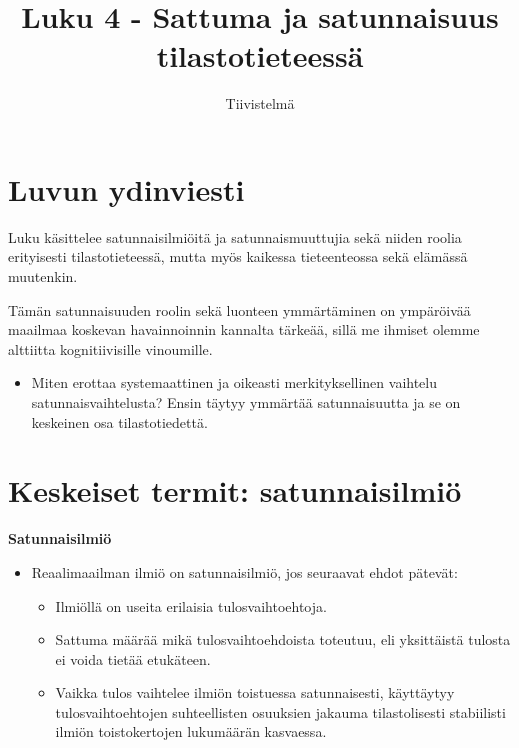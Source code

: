 \documentclass[
]{report}
\title{Luku 4 - Sattuma ja satunnaisuus tilastotieteessä}
\subtitle{Tiivistelmä}
\author{}
\date{}
\providecommand{\tightlist}{%
  \setlength{\itemsep}{0pt}\setlength{\parskip}{0pt}}\usepackage{longtable,booktabs,array}
\begin{document}
\maketitle
\ifdefined\Shaded\renewenvironment{Shaded}{\begin{tcolorbox}[borderline west={3pt}{0pt}{shadecolor}, boxrule=0pt, sharp corners, interior hidden, breakable, enhanced, frame hidden]}{\end{tcolorbox}}\fi

\hypertarget{luvun-ydinviesti}{%
\section{Luvun ydinviesti}\label{luvun-ydinviesti}}

Luku käsittelee satunnaisilmiöitä ja satunnaismuuttujia sekä niiden
roolia erityisesti tilastotieteessä, mutta myös kaikessa tieteenteossa
sekä elämässä muutenkin.

Tämän satunnaisuuden roolin sekä luonteen ymmärtäminen on ympäröivää
maailmaa koskevan havainnoinnin kannalta tärkeää, sillä me ihmiset
olemme alttiitta kognitiivisille vinoumille.

\begin{itemize}
\tightlist
\item
  Miten erottaa systemaattinen ja oikeasti merkityksellinen vaihtelu
  satunnaisvaihtelusta? Ensin täytyy ymmärtää satunnaisuutta ja se on
  keskeinen osa tilastotiedettä.
\end{itemize}

\hypertarget{keskeiset-termit-satunnaisilmiuxf6}{%
\section{Keskeiset termit:
satunnaisilmiö}\label{keskeiset-termit-satunnaisilmiuxf6}}

\begin{defblock}{}

\textbf{Satunnaisilmiö}

\begin{itemize}
\item
  Reaalimaailman ilmiö on satunnaisilmiö, jos seuraavat ehdot pätevät:

  \begin{itemize}
  \item
    Ilmiöllä on useita erilaisia tulosvaihtoehtoja.
  \item
    Sattuma määrää mikä tulosvaihtoehdoista toteutuu, eli yksittäistä
    tulosta ei voida tietää etukäteen.
  \item
    Vaikka tulos vaihtelee ilmiön toistuessa satunnaisesti, käyttäytyy
    tulosvaihtoehtojen suhteellisten osuuksien jakauma tilastolisesti
    stabiilisti ilmiön toistokertojen lukumäärän kasvaessa.
  \end{itemize}
\end{itemize}

\end{defblock}
\end{document}
